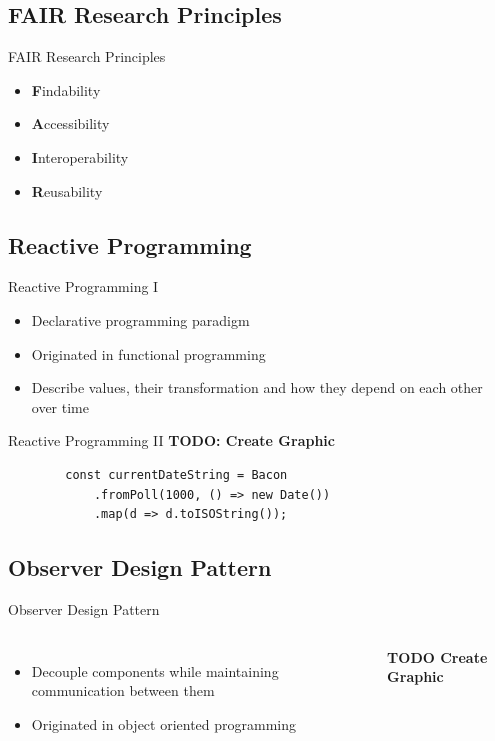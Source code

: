 \documentclass{beamer}
\begin{document}
\subsection*{FAIR Research Principles}
\begin{frame}{FAIR Research Principles}
	\begin{itemize}
		\item \textbf{F}indability\bigskip
		\item \textbf{A}ccessibility\bigskip
		\item \textbf{I}nteroperability\bigskip
		\item \textbf{R}eusability
	\end{itemize}
\end{frame}

\subsection*{Reactive Programming}
\begin{frame}{Reactive Programming I}
	\begin{itemize}
		\item Declarative programming paradigm\bigskip
		\item Originated in functional programming\bigskip
		\item Describe values, their transformation and how they depend on each other over time\bigskip
	\end{itemize}
\end{frame}

\begin{frame}[fragile=singleslide]{Reactive Programming II}
	\textbf{TODO: Create Graphic}

	\begin{verbatim}
		const currentDateString = Bacon
			.fromPoll(1000, () => new Date())
			.map(d => d.toISOString());
	\end{verbatim}
\end{frame}

\subsection*{Observer Design Pattern}
\begin{frame}{Observer Design Pattern \cite{gamma1995design}}
	\begin{columns}[t, onlytextwidth]
			\begin{itemize}
				\item Decouple components while maintaining communication between them\bigskip
				\item Originated in object oriented programming\bigskip
			\end{itemize}

			\textbf{TODO Create Graphic}
	\end{columns}
\end{frame}
\end{document}
